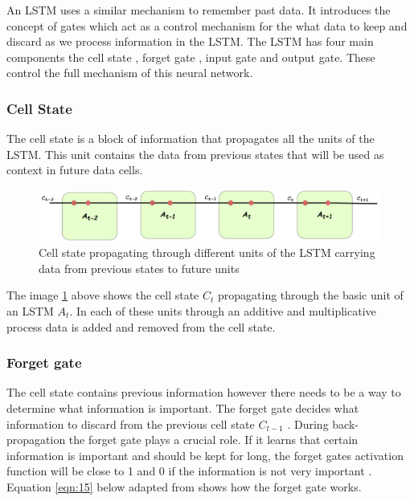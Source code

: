 An LSTM uses a similar mechanism  to remember past data. It introduces the concept of gates which act as a control mechanism for the what data to keep and discard as we process information in the LSTM. The LSTM has four main components the cell state , forget gate , input gate and output gate. These control the full mechanism of this neural network.

\subsubsection{Cell State}
The cell state is a block of information that propagates all the units of the LSTM. This unit contains the data from previous states that will be used as context in future data cells. \\ 

\begin{figure}[h]
	\centering
	\includegraphics[width=1\linewidth]{Chapters/images/cellstate}
	\caption{Cell state propagating through different units of the LSTM carrying data from previous states to future units}
	\label{fig:cellstate}
\end{figure} 

 The image \ref{fig:cellstate} above shows the cell state \textit{$C_{t}$} propagating through the basic unit of an LSTM \textit{$A_t$}. In each of these units through an additive and multiplicative process data is added and removed from the cell state. 
 \subsubsection{Forget gate}
 
The cell state contains previous information however there needs to be a way to determine what information is important. The forget gate decides what information to discard from the previous cell state  \textit{$C_{t-1}$} \cite{zhu2025novel}. During back-propagation the forget gate plays a crucial role. If it learns that certain information is important and should be kept for long, the forget gates activation function will be close to 1 and 0 if the information is not very important \cite{zhu2025novel}. Equation \ref{eqn:15}  below adapted from \cite{colah2015understanding} shows how the forget gate works.

